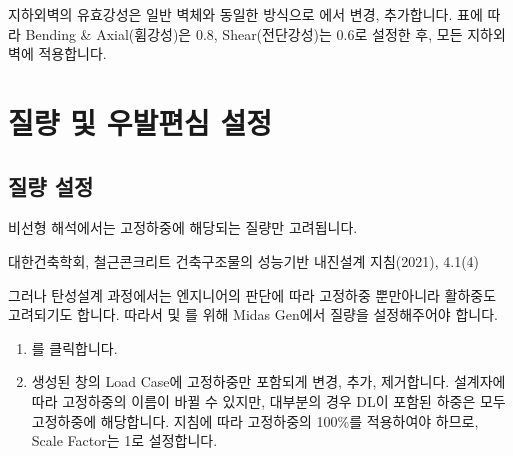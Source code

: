 \documentclass[a4paper,11pt,korean,openany,oneside]{sphinxmanual}
\begin{document}
\begin{figure}[htbp]
\centering
\capstart

\noindent{}
\caption{}\label{\detokenize{1_stiffness_setting:id11}}\end{figure}

\sphinxAtStartPar
지하외벽의 유효강성은 일반 벽체와 동일한 방식으로 에서 변경, 추가합니다.
표에 따라 Bending \& Axial(휨강성)은 \(0.8\), Shear(전단강성)는 \(0.6\)로 설정한 후, 모든 지하외벽에 적용합니다.

\sphinxstepscope


\section{질량 및 우발편심 설정}
\label{\detokenize{1_mass_ecc_setting:id1}}\label{\detokenize{1_mass_ecc_setting::doc}}

\subsection{질량 설정}
\label{\detokenize{1_mass_ecc_setting:id2}}
\sphinxAtStartPar
비선형 해석에서는 고정하중에 해당되는 질량만 고려됩니다. %
\begin{footnote}[1]\sphinxAtStartFootnote
대한건축학회, 철근콘크리트 건축구조물의 성능기반 내진설계 지침(2021), 4.1\sphinxhyphen{}(4)
%
\end{footnote}
그러나 탄성설계 과정에서는 엔지니어의 판단에 따라 고정하중 뿐만아니라 활하중도 고려되기도 합니다.
따라서  및 를 위해 Midas Gen에서 질량을 설정해주어야 합니다.

\begin{sphinxShadowBox}
\begin{enumerate}
%
\item {} 
\sphinxAtStartPar
{} \sphinxhyphen{}  를 클릭합니다.

\item {} 
\sphinxAtStartPar
생성된 창의 Load Case에 고정하중만 포함되게 변경, 추가, 제거합니다.
설계자에 따라 고정하중의 이름이 바뀔 수 있지만, 대부분의 경우 DL이 포함된 하중은 모두 고정하중에 해당합니다.
지침에 따라 고정하중의 100\%를 적용하여야 하므로, Scale Factor는 1로 설정합니다.


\end{enumerate}
\end{sphinxShadowBox}
\end{document}
